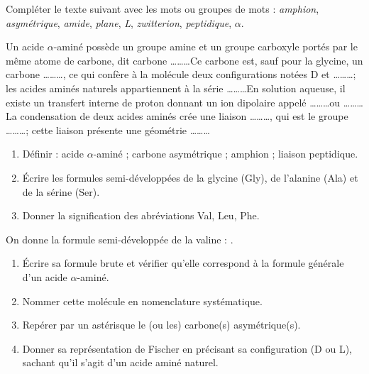 \documentclass[11pt]{article}
\newcounter{popsec}
\newcounter{popsub}
\newcommand{\courssub}[1]{%
  \stepcounter{popsub}%
  \par\vspace{9pt}\noindent{\popxbold\fontsize{11.5}{13}\selectfont\color{popink}{\color{poporange}\thepopsec.\thepopsub}\hspace{6pt}#1}\par\nopagebreak\vspace{4pt}
}
\begin{document}
\begin{exercice}
Compléter le texte suivant avec les mots ou groupes de mots : \emph{amphion}, \emph{asymétrique}, \emph{amide}, \emph{plane}, \emph{L}, \emph{zwitterion}, \emph{peptidique}, \emph{$\alpha$}.

Un acide $\alpha$-aminé possède un groupe amine et un groupe carboxyle portés par le même atome de carbone, dit carbone \ldots\ldots\ldots Ce carbone est, sauf pour la glycine, un carbone \ldots\ldots\ldots, ce qui confère à la molécule deux configurations notées D et \ldots\ldots\ldots ; les acides aminés naturels appartiennent à la série \ldots\ldots\ldots En solution aqueuse, il existe un transfert interne de proton donnant un ion dipolaire appelé \ldots\ldots\ldots ou \ldots\ldots\ldots La condensation de deux acides aminés crée une liaison \ldots\ldots\ldots, qui est le groupe \ldots\ldots\ldots ; cette liaison présente une géométrie \ldots\ldots\ldots
\end{exercice}

\begin{exercice}
\begin{enumerate}
\item Définir : acide $\alpha$-aminé ; carbone asymétrique ; amphion ; liaison peptidique.
\item Écrire les formules semi-développées de la glycine (Gly), de l'alanine (Ala) et de la sérine (Ser).
\item Donner la signification des abréviations Val, Leu, Phe.
\end{enumerate}
\end{exercice}

\courssub{Je m'entraîne}

\begin{exercice}
On donne la formule semi-développée de la valine : .
\begin{enumerate}
\item Écrire sa formule brute et vérifier qu'elle correspond à la formule générale d'un acide $\alpha$-aminé.
\item Nommer cette molécule en nomenclature systématique.
\item Repérer par un astérisque le (ou les) carbone(s) asymétrique(s).
\item Donner sa représentation de Fischer en précisant sa configuration (D ou L), sachant qu'il s'agit d'un acide aminé naturel.
\end{enumerate}
\end{exercice}
\end{document}
